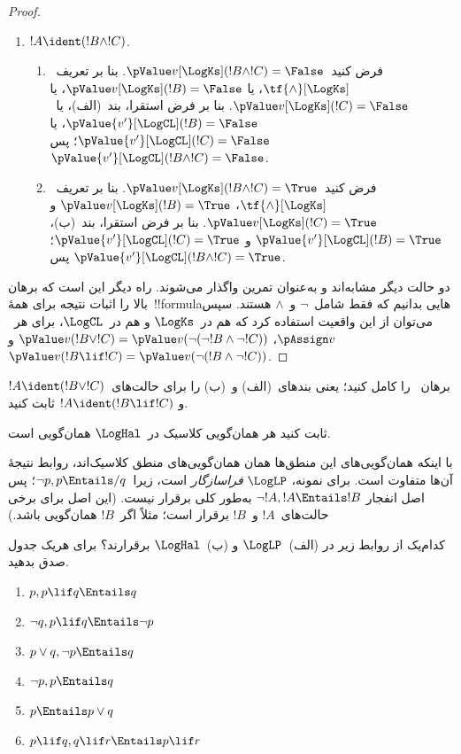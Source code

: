 \documentclass[../../../include/open-logic-section]{subfiles}
\begin{document}
\begin{proof}
\begin{enumerate}
    \item $!A \ident (!B \land !C)$.
    \begin{enumerate}
      \item فرض کنید~$\pValue v[\LogKs](!B \land !C) = \False$. بنا بر
      تعریف~$\tf{\land}[\LogKs]$، یا
      $\pValue v[\LogKs](!B) = \False$، یا
      $\pValue v[\LogKs](!C) = \False$. بنا بر فرض استقرا، بند~(الف)،
      یا~$\pValue {v'}[\LogCL](!B) = \False$، یا
      $\pValue {v'}[\LogCL](!C) = \False$؛ پس
      $\pValue {v'}[\LogCL](!B \land !C) = \False$.
      \item فرض کنید~$\pValue v[\LogKs](!B \land !C) = \True$. بنا بر
      تعریف~$\tf{\land}[\LogKs]$،
      $\pValue v[\LogKs](!B) = \True$ و
      $\pValue v[\LogKs](!C) = \True$. بنا بر فرض استقرا، بند~(ب)،
      $\pValue {v'}[\LogCL](!B) = \True$ و
      $\pValue {v'}[\LogCL](!C) = \True$؛ پس
      $\pValue {v'}[\LogCL](!B \land !C) = \True$.
    \end{enumerate}
  \end{enumerate}

  دو حالت دیگر مشابه‌اند و به‌عنوان تمرین واگذار می‌شوند. راه دیگر این
  است که برهان بالا را اثبات نتیجه برای همهٔ~!!{formula}هایی بدانیم که
  فقط شامل~$\lnot$ و~$\land$ هستند. سپس می‌توان از این واقعیت استفاده
  کرد که هم در~$\LogKs$ و هم در~$\LogCL$، برای هر~$\pAssign v$،
  $\pValue v(!B \lor !C) = \pValue v(\lnot(\lnot!B \land \lnot !C))$
  و~$\pValue v(!B \lif !C) = \pValue v(\lnot(!B \land \lnot !C))$.
\end{proof}

\begin{prob}
  برهان~ را کامل کنید؛ یعنی
  بندهای~(الف) و~(ب) را برای حالت‌های~$!A \ident (!B \lor !C)$ و
  $!A \ident (!B \lif !C)$ ثابت کنید.
\end{prob}

\begin{prob}
ثابت کنید هر همان‌گویی کلاسیک در~$\LogHal$ همان‌گویی است.
\end{prob}

با اینکه همان‌گویی‌های این منطق‌ها همان همان‌گویی‌های منطق کلاسیک‌اند،
روابط نتیجهٔ آن‌ها متفاوت است. برای نمونه، $\LogLP$
\emph{فرا‌سازگار} است، زیرا~$\lnot p, p \Entails/ q$؛ پس اصل انفجار
$\lnot !A, !A \Entails !B$ به‌طور کلی برقرار نیست. (این اصل برای برخی
حالت‌های~$!A$ و~$!B$ برقرار است؛ مثلاً اگر~$!B$ همان‌گویی باشد.)

\begin{prob}
  کدام‌یک از روابط زیر در (الف)~$\LogLP$ و (ب)~$\LogHal$ برقرارند؟
  برای هریک جدول صدق بدهید.
  \begin{enumerate}
    \item $p, p \lif q \Entails q$
    \item $\lnot q, p \lif q \Entails \lnot p$
    \item $p \lor q, \lnot p \Entails q$
    \item $\lnot p, p \Entails q$
    \item $p \Entails p \lor q$
    \item $p \lif q, q\lif r \Entails p \lif r$
  \end{enumerate}
\end{prob}
\end{document}
